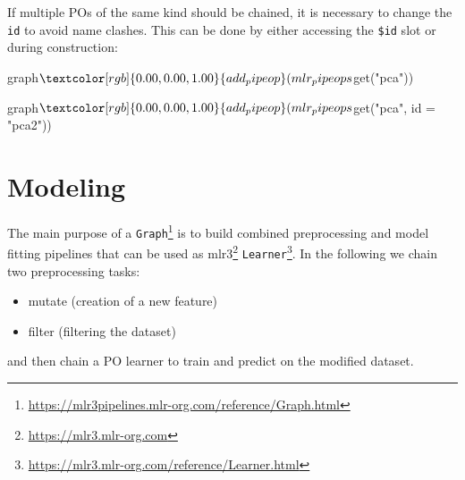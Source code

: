 \documentclass[12pt,]{scrbook}
\newenvironment{Shaded}{}{}
\newcommand{\DataTypeTok}[1]{#1}
\newcommand{\KeywordTok}[1]{\textcolor[rgb]{0.00,0.00,1.00}{#1}}
\newcommand{\NormalTok}[1]{#1}
\newcommand{\OperatorTok}[1]{#1}
\newcommand{\StringTok}[1]{\textcolor[rgb]{0.00,0.50,0.50}{#1}}
\providecommand{\tightlist}{%
  \setlength{\itemsep}{0pt}\setlength{\parskip}{0pt}}
\renewcommand{\href}[2]{#2\footnote{\url{#1}}}
\begin{document}
If multiple POs of the same kind should be chained, it is necessary to change the \texttt{id} to avoid name clashes.
This can be done by either accessing the \texttt{\$id} slot or during construction:

\begin{Shaded}
\begin{Highlighting}[]
\NormalTok{graph}\OperatorTok{$}\KeywordTok{add_pipeop}\NormalTok{(mlr_pipeops}\OperatorTok{$}\KeywordTok{get}\NormalTok{(}\StringTok{"pca"}\NormalTok{))}
\end{Highlighting}
\end{Shaded}

\begin{Shaded}
\begin{Highlighting}[]
\NormalTok{graph}\OperatorTok{$}\KeywordTok{add_pipeop}\NormalTok{(mlr_pipeops}\OperatorTok{$}\KeywordTok{get}\NormalTok{(}\StringTok{"pca"}\NormalTok{, }\DataTypeTok{id =} \StringTok{"pca2"}\NormalTok{))}
\end{Highlighting}
\end{Shaded}

\hypertarget{pipe-modeling}{%
\section{Modeling}\label{pipe-modeling}}

The main purpose of a \href{https://mlr3pipelines.mlr-org.com/reference/Graph.html}{\texttt{Graph}} is to build combined preprocessing and model fitting pipelines that can be used as \href{https://mlr3.mlr-org.com}{mlr3} \href{https://mlr3.mlr-org.com/reference/Learner.html}{\texttt{Learner}}.
In the following we chain two preprocessing tasks:

\begin{itemize}
\tightlist
\item
  mutate (creation of a new feature)
\item
  filter (filtering the dataset)
\end{itemize}

and then chain a PO learner to train and predict on the modified dataset.

\begin{Shaded}
\end{Shaded}
\end{document}
